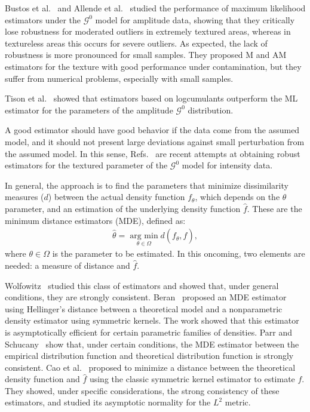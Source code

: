 \documentclass[twocolumn]{svjour3}
\newcommand{\argmin}{\operatorname*{\text{arg min }}}
\begin{document}
	Bustos et al.~\cite{BustosFreryLucini:Mestimators:2001} and
	Allende et al.~\cite{AllendeFreryetal:JSCS:05} studied the performance of maximum likelihood estimators under the $\mathcal{G}^{0}$ model for amplitude data, showing that they critically lose robustness for moderated outliers in extremely textured areas, whereas in textureless areas this occurs for severe outliers.
	As expected, the lack of robustness is more pronounced for small samples. 
	They proposed M and AM estimators for the texture with good performance under contamination, but they suffer from numerical problems, especially with small samples.
	
	Tison et al.~\cite{Tison2004} showed that estimators based on logcumulants outperform the ML estimator for the parameters of the amplitude $\mathcal G^0$ distribution.
	
	A good estimator should have good behavior if the data come from the assumed model, and it should not present large deviations against small perturbation from the assumed model.
	In this sense, Refs.~\cite{APSAR2013ParameterEstimationStochasticDistances,gambini2015} are recent attempts at obtaining robust estimators for the textured parameter of the $\mathcal{G}^0$ model for intensity data.
	
	In general, the approach is to find the parameters that minimize dissimilarity measures ($d$) between the actual density function $f_{\theta}$, which depends on the $\theta$ parameter, and an estimation of the underlying density function $\widehat{f}$. 
	These are the minimum distance estimators (MDE), defined as:
	\begin{align}
	\label{MDEGeneral}
	\widehat{\theta}=
	\argmin_{\theta\in\Omega}
	d(f_{\theta}, \widehat{f}),
	\end{align}
	where $\theta\in\Omega$ is the parameter to be estimated. In this oncoming, two elements are needed: a measure of distance and $\widehat{f}$.
	
	Wolfowitz~\cite{wolfowitz1953, wolfowitz1957} studied this class of estimators and showed that, under general conditions, they are strongly consistent. 
	Beran~\cite{beran1977} proposed an MDE estimator using Hellinger's distance between a theoretical model and a nonparametric density estimator using symmetric kernels. 
	The work showed that this estimator is asymptotically efficient for certain parametric families of densities. 
	Parr and Schucany~\cite{parr1982} show that, under certain conditions, the MDE estimator between the empirical distribution function and theoretical distribution function is strongly consistent. 
	Cao et al.~\cite{cao1995minimum} proposed to minimize a distance between the theoretical density function and $\widehat{f}$ using the classic symmetric kernel estimator to estimate $f$. 
	They showed, under specific considerations, the strong consistency of these estimators, and studied its asymptotic normality for the $L^2$ metric.
	
\end{document}
